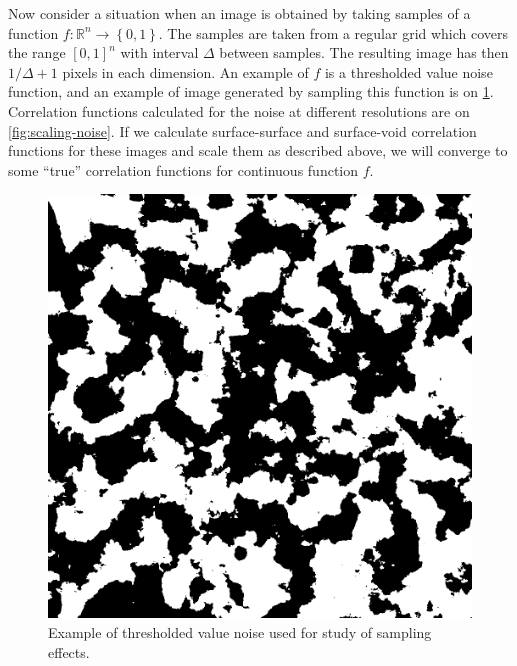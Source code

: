 \documentclass[reprint,amsmath,amssymb,aps,pre,showkeys,showpacs]{revtex4-1}
\begin{document}
Now consider a situation when an image is obtained by taking samples of a function
$f: \mathbb{R}^n \rightarrow \left\{0, 1\right\}$. The samples are taken from a
regular grid which covers the range $[0, 1]^n$  with interval $\Delta$ between
samples. The resulting image has then $1/\Delta + 1$ pixels in each
dimension. An example of $f$ is a thresholded value noise function, and an
example of image generated by sampling this function is on
\cref{fig:noise}. Correlation functions calculated for the noise at different
resolutions are on \cref{fig:scaling-noise}. If we calculate surface-surface and
surface-void correlation functions for these images and scale them as described
above, we will converge to some ``true'' correlation functions for continuous
function $f$.
\begin{figure}[ht]
  \centering
  \includegraphics[width=0.9\linewidth]{images/noise.png}
  \caption[]{Example of thresholded value noise used for study of sampling
    effects.}
  \label{fig:noise}
\end{figure}
\end{document}
